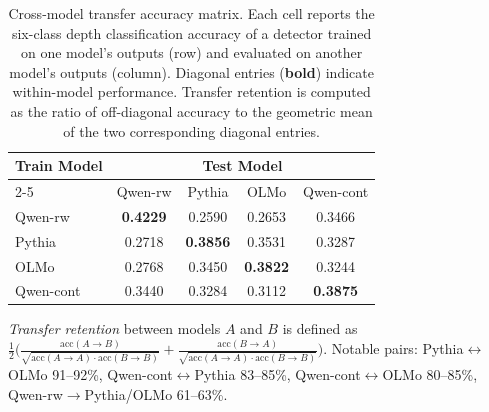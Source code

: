 \begin{table}[t]
  \centering
  \caption{Cross-model transfer accuracy matrix. Each cell reports the six-class depth classification accuracy of a detector trained on one model's outputs (row) and evaluated on another model's outputs (column). Diagonal entries (\textbf{bold}) indicate within-model performance. Transfer retention is computed as the ratio of off-diagonal accuracy to the geometric mean of the two corresponding diagonal entries.}
  \label{tab:s1_transfer}
  \begin{tabular}{lcccc}
    \toprule
    \multirow{2}{*}{\textbf{Train Model}} & \multicolumn{4}{c}{\textbf{Test Model}} \\
    \cmidrule(lr){2-5}
    & Qwen-rw & Pythia & OLMo & Qwen-cont \\
    \midrule
    Qwen-rw   & \textbf{0.4229} & 0.2590 & 0.2653 & 0.3466 \\
    Pythia    & 0.2718 & \textbf{0.3856} & 0.3531 & 0.3287 \\
    OLMo      & 0.2768 & 0.3450 & \textbf{0.3822} & 0.3244 \\
    Qwen-cont & 0.3440 & 0.3284 & 0.3112 & \textbf{0.3875} \\
    \bottomrule
  \end{tabular}
  \vspace{4pt}

  \footnotesize
  \textit{Transfer retention} between models $A$ and $B$ is defined as $\frac{1}{2}\bigl(\frac{\mathrm{acc}(A \to B)}{\sqrt{\mathrm{acc}(A \to A) \cdot \mathrm{acc}(B \to B)}} + \frac{\mathrm{acc}(B \to A)}{\sqrt{\mathrm{acc}(A \to A) \cdot \mathrm{acc}(B \to B)}}\bigr)$.
  Notable pairs: Pythia$\leftrightarrow$OLMo 91--92\%, Qwen-cont$\leftrightarrow$Pythia 83--85\%, Qwen-cont$\leftrightarrow$OLMo 80--85\%, Qwen-rw$\to$Pythia/OLMo 61--63\%.
\end{table}

